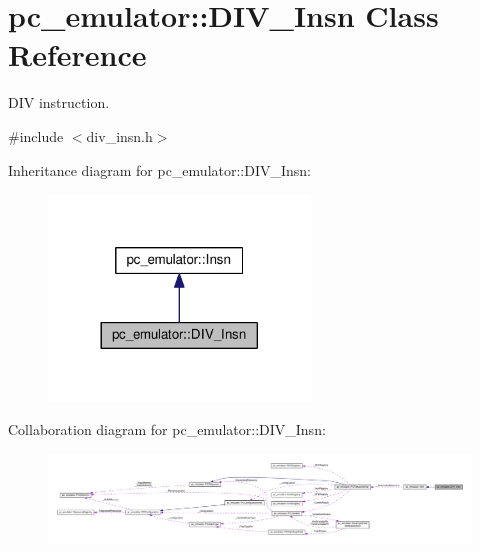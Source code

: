 \hypertarget{classpc__emulator_1_1DIV__Insn}{}\section{pc\+\_\+emulator\+:\+:D\+I\+V\+\_\+\+Insn Class Reference}
\label{classpc__emulator_1_1DIV__Insn}


D\+IV instruction.  




{\ttfamily \#include $<$div\+\_\+insn.\+h$>$}



Inheritance diagram for pc\+\_\+emulator\+:\+:D\+I\+V\+\_\+\+Insn\+:
\nopagebreak
\begin{figure}[H]
\begin{center}
\leavevmode
\includegraphics[width=197pt]{classpc__emulator_1_1DIV__Insn__inherit__graph}
\end{center}
\end{figure}


Collaboration diagram for pc\+\_\+emulator\+:\+:D\+I\+V\+\_\+\+Insn\+:
\nopagebreak
\begin{figure}[H]
\begin{center}
\leavevmode
\includegraphics[width=350pt]{classpc__emulator_1_1DIV__Insn__coll__graph}
\end{center}
\end{figure}
